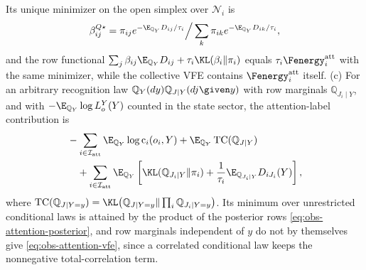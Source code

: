 Its unique minimizer on the open simplex over \(\mathcal N_i\) is
\begin{equation}
\beta^{Q\star}_{ij}
=\pi_{ij}e^{-\E_{\mathbb Q_Y}D_{ij}/\tau_i}\Big/\sum_k\pi_{ik}e^{-\E_{\mathbb Q_Y}D_{ik}/\tau_i},
\label{eq:obs-attention-recognition-optimum}
\end{equation}
and the row functional
\(\sum_j\beta_{ij}\E_{\mathbb Q_Y}D_{ij}+\tau_i\KL(\beta_i\Vert\pi_i)\) equals
\(\tau_i\Fenergy_i^{\rm att}\) with the same minimizer, while the collective VFE
contains \(\Fenergy_i^{\rm att}\) itself. (c) For an arbitrary recognition law
\(\mathbb Q_Y(dy)\mathbb Q_{J\mid Y}(dj\given y)\) with row marginals
\(\mathbb Q_{J_i\mid Y}\), and with \(-\E_{\mathbb Q_Y}\log L_o^Y(Y)\) counted
in the state sector, the attention-label contribution is
\begin{equation}
\begin{split}
&-\sum_{i\in\mathcal I_{\rm att}}\E_{\mathbb Q_Y}\log\mathrm c_i(o_i,Y)
+\E_{\mathbb Q_Y}\operatorname{TC}(\mathbb Q_{J\mid Y})\\
&\quad+\sum_{i\in\mathcal I_{\rm att}}\E_{\mathbb Q_Y}\left[
\KL(\mathbb Q_{J_i\mid Y}\Vert\pi_i)
+\frac{1}{\tau_i}
\E_{\mathbb Q_{J_i\mid Y}}D_{iJ_i}(Y)
\right],
\end{split}
\label{eq:obs-attention-correlated-ledger}
\end{equation}
where
\(\operatorname{TC}(\mathbb Q_{J\mid Y=y})=
\KL\bigl(\mathbb Q_{J\mid Y=y}\Vert\prod_i\mathbb Q_{J_i\mid Y=y}\bigr)\). Its
minimum over unrestricted conditional laws is attained by the product of the
posterior rows \eqref{eq:obs-attention-posterior}, and row marginals
independent of \(y\) do not by themselves give \eqref{eq:obs-attention-vfe},
since a correlated conditional law keeps the nonnegative total-correlation
term.

